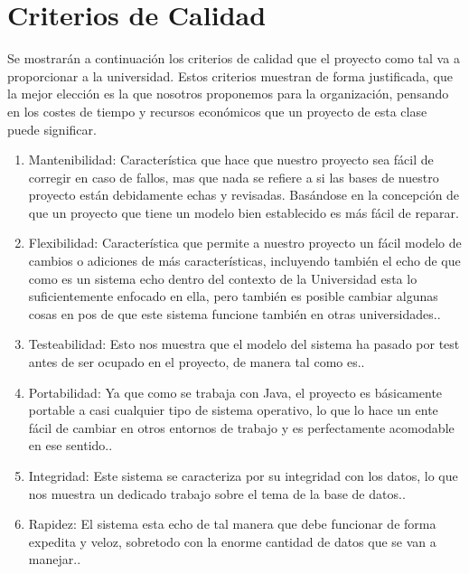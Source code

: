 \documentclass[a4paper,12pt,openany,oneside]{book}
\begin{document}
\section{Criterios de Calidad}

Se mostrarán a continuación los criterios de calidad que el proyecto como tal va a proporcionar a la universidad. Estos criterios muestran de forma justificada, que la mejor elección es la que nosotros proponemos para la organización, pensando en los costes de tiempo y recursos económicos que un proyecto de esta clase puede significar.

\begin{enumerate}

\item Mantenibilidad: Característica que hace que nuestro proyecto sea fácil de corregir en caso de fallos, mas que nada se refiere a si las bases de nuestro proyecto están debidamente echas y revisadas. Basándose en la concepción de que un proyecto que tiene un modelo bien establecido es más fácil de reparar\cite{data11}.

\item Flexibilidad: Característica que permite a nuestro proyecto un fácil modelo de cambios o adiciones de más características, incluyendo también el echo de que como es un sistema echo dentro del contexto de la Universidad esta lo suficientemente enfocado en ella, pero también es posible cambiar algunas cosas en pos de que este sistema funcione también en otras universidades.\cite{data11}.

\item Testeabilidad: Esto nos muestra que el modelo del sistema ha pasado por test antes de ser ocupado en el proyecto, de manera tal como es.\cite{data11}.

\item Portabilidad: Ya que como se trabaja con Java, el proyecto es básicamente portable a casi cualquier tipo de sistema operativo, lo que lo hace un ente fácil de cambiar en otros entornos de trabajo y es perfectamente acomodable en ese sentido.\cite{data11}.

\item Integridad: Este sistema se caracteriza por su integridad con los datos, lo que nos muestra un dedicado trabajo sobre el tema de la base de datos.\cite{data11}.

\item Rapidez: El sistema esta echo de tal manera que debe funcionar de forma expedita y veloz, sobretodo con la enorme cantidad de datos que se van a manejar.\cite{data11}.

\end{enumerate}
\end{document}
